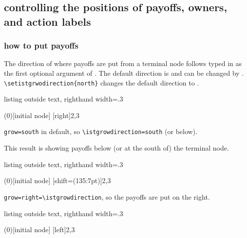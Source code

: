 \subsection{controlling the positions of payoffs, owners, and action labels}

\subsubsection*{how to put payoffs}

The direction of where payoffs are put from a terminal node follows \cmd{\istgrowdirection} typed in as the first optional argument of \cmd{\istroot}.
The default direction is  and can be changed by \cmd{\setistgrowdirection}.
\verb|\setistgrwodirection{north}| changes the default direction to .

\begin{tcblisting}{listing outside text, righthand width=.3\linewidth}
\begin{istgame}
\xtShowTerminalNodes
\istroot(0)[initial node]
  [right]{2,3}
\endist
\end{istgame}
\end{tcblisting}

\verb|grow=south| in default, so \verb|\istgrowdirection=south| (or below).\par
This result is showing payoffs below (or at the south of) the terminal node.

\begin{tcblisting}{listing outside text, righthand width=.3\linewidth}
\begin{istgame}
\istroot[right](0)[initial node]
  [shift=(135:7pt)]{2,3}
\endist
\end{istgame}
\end{tcblisting}

\verb|grow=right=\istgrowdirection|, so the payoffs are put on the right.
%
\begin{tcblisting}{listing outside text, righthand width=.3\linewidth}
\begin{istgame}
\istroot(0)[initial node]
  [left]{2,3}
\endist
\end{istgame}
\end{tcblisting}

